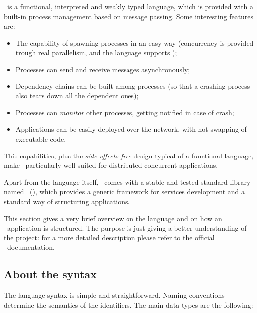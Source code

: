 \Erlang\ is a functional, interpreted and weakly typed language, which
is provided with a built-in process management  based on
message passing. Some interesting features are:
\begin{itemize}
\item   The capability of spawning processes in an easy way
        (concurrency is provided trough real parallelism, and the
        language supports );
\item   Processes can send and receive messages asynchronously;
\item   Dependency chains can be built among processes (so that a
        crashing process also tears down all the dependent ones);
\item   Processes can \emph{monitor} other processes, getting notified
        in case of crash;
\item   Applications can be easily deployed over the network, with hot
        swapping of executable code.
\end{itemize}

This capabilities, plus the \emph{side-effects free} design typical
of a functional language, make \Erlang\ particularly well suited for
distributed concurrent applications.

Apart from the language itself, \Erlang\ comes with a stable and tested
standard library named \OTP\ (\OTPa), which provides a generic framework
for services development and a standard way of structuring applications.

This section gives a very brief overview on the language and on how an
\Erlang\ application is structured. The purpose is just giving a better
understanding of the project: for a more detailed description please
refer to the official \Erlang\ documentation\cite{bib:ErlApp}.


\subsection{About the syntax}

The language syntax is simple and straightforward. Naming
conventions determine the semantics of the identifiers. The main data
types are the following:

